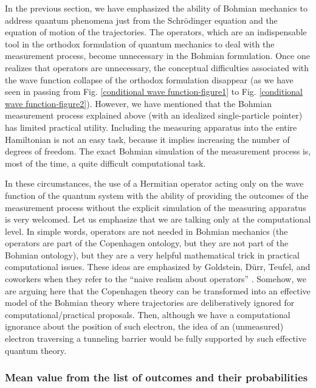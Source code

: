 \documentclass[nofootinbib, secnumarabic, amsmath, nobibnotes,11pt,aps,pra, floatfix]{revtex4-1}
\newcommand{\fref}[1]{Fig. \ref{#1}}
\begin{document}
In the previous section, we have emphasized the ability of Bohmian
mechanics to address quantum phenomena just from the
Schr\"odinger equation and the equation of motion of the
trajectories. The operators, which are an indispensable tool in the
orthodox formulation of quantum mechanics to deal with  the measurement
process, become unnecessary in the Bohmian formulation. Once one
realizes that operators are unnecessary, the conceptual difficulties
associated with the wave function collapse of the orthodox
formulation disappear (as we have seen in passing from \fref{conditional wave function-figure1} to \fref{conditional wave function-figure2}). However, we have mentioned that the Bohmian measurement process explained above (with an idealized single-particle pointer) has limited practical utility. Including the measuring apparatus into the entire
Hamiltonian is not an easy task, because it implies increasing the
number of degrees of freedom. The exact Bohmian simulation of the measurement
process is, most of the time, a quite difficult computational task.

In these circumstances, the use of a Hermitian operator acting only
on the wave function of the quantum system with the ability of
providing the outcomes of the measurement process without the
explicit simulation of the measuring apparatus is very welcomed. Let
us emphasize that we are talking only at the computational level. In
simple words, operators are not needed in Bohmian mechanics (the operators are part of the Copenhagen ontology, but they are not part of the Bohmian ontology), but
they are a very helpful mathematical trick in practical
computational issues. These ideas are emphasized by Goldstein,
D\"{u}rr, Teufel, and coworkers when they refer to the ``naive
realism about operators'' \cite{om.Durrnaive,om.Durrllibre,om.goldstein}. Somehow, we are arguing here that the Copenhagen theory can be transformed into an effective model of the Bohmian theory where trajectories are deliberatively ignored  for computational/practical  proposals. Then, although we have a computational ignorance about the position of such electron, the idea of an (unmeasured) electron traversing a tunneling barrier would be fully supported by such effective quantum theory.  


\subsubsection{Mean value from the list of outcomes and their probabilities}
\end{document}
